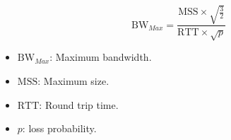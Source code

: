 \begin{equation}\label{eq:TCP_Maximum_Bandwidth}
  \mathrm{BW}_{Max} = \frac{\mathrm{MSS} \times \sqrt{\frac{3}{2}}}{\mathrm{RTT} \times \sqrt{p}}
\end{equation}
\begin{itemize}[noitemsep]
\item $\mathrm{BW}_{Max}$: Maximum bandwidth.
\item $\mathrm{MSS}$: Maximum   size.
\item $\mathrm{RTT}$: Round trip time.
\item $p$:  loss probability.
\end{itemize}

